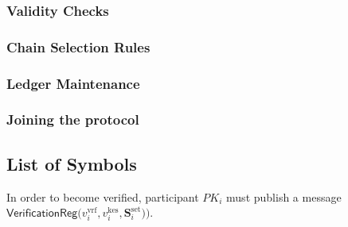 \subsubsection{Validity Checks}


\subsubsection{Chain Selection Rules}


\subsubsection{Ledger Maintenance}


\subsubsection{Joining the protocol}


\newpage

\subsection{List of Symbols}\label{subsec:list-of-symbols}


In order to become verified, participant $PK_i$ must publish a message ${\textsf{VerificationReg(}v^{\text{vrf}}_{i}, v^{\text{kes}}_{i}, \mathbf{S}_i^{\text{set}})\textsf{)}}$.






